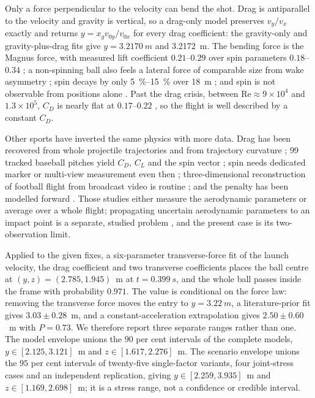 Only a force perpendicular to the velocity can bend the shot. Drag is
antiparallel to the velocity and gravity is vertical, so a drag-only model
preserves $v_y/v_x$ exactly and returns $y=x_g v_{0y}/v_{0x}$ for every drag
coefficient: the gravity-only and gravity-plus-drag fits give $y=\SI{3.2170}{m}$ and
\SI{3.2172}{m}. The bending force is the Magnus force, with measured lift
coefficient $0.21$--$0.29$ over spin parameters $0.18$--$0.34$
\citep{asai2020}; a non-spinning ball also feels a lateral force of comparable
size from wake asymmetry \citep{texier2016}; spin decays by only
\SIrange{5}{15}{\percent} over \SI{18}{m} \citep{tsukada2008}; and spin is not
observable from positions alone \citep{achterhold2023}. Past the drag crisis,
between $\mathrm{Re}\approx9\times10^4$ and $1.3\times10^5$, $C_D$ is nearly flat at
$0.17$--$0.22$ \citep{carre2005,goff2012,mehta1985}, so the flight is
well described by a constant $C_D$.

Other sports have inverted the same physics with more data. Drag has been
recovered from whole projectile trajectories \citep{florio2019} and from
trajectory curvature \citep{jsme2014}; 99 tracked baseball pitches yield
$C_D$, $C_L$ and the spin vector \citep{nathan2008pitchfx}; spin needs
dedicated marker or multi-view measurement even then \citep{shorter2013};
three-dimensional reconstruction of football flight from broadcast video is
routine \citep{grad2026,vorobev2025}; and the penalty has been modelled
forward \citep{parashar2022}. Those studies either measure the aerodynamic
parameters or average over a whole flight; propagating uncertain aerodynamic
parameters to an impact point is a separate, studied problem
\citep{mehta2015,williamson2017}, and the present case is its
two-observation limit.

Applied to the given fixes, a six-parameter transverse-force fit of the
launch velocity, the drag coefficient and two transverse coefficients places
the ball centre at $(y,z)=(2.785,1.945)$~m at
$t=\SI{0.399}{s}$, and the whole ball passes inside the frame with
probability $0.971$. The value is conditional on the force law:
removing the transverse force moves the entry to $y=\SI{3.22}{m}$, a
literature-prior fit gives $3.03\pm0.28$~m, and a constant-acceleration
extrapolation gives $2.50\pm0.60$~m with $P=0.73$. We therefore report three
separate ranges rather than one. The model envelope unions the $90$ per cent
intervals of the complete models, $y\in[2.125,3.121]$~m and
$z\in[1.617,2.276]$~m. The scenario envelope unions the $95$ per cent intervals
of twenty-five single-factor variants, four joint-stress cases and an
independent replication, giving $y\in[2.259,3.935]$~m and
$z\in[1.169,2.698]$~m; it is a stress range, not a confidence or credible
interval.
